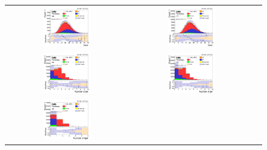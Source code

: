 \begin{figure}[ht]
  \begin{center}
    \begin{tabular}{ccc}
      \includegraphics[width=0.4\textwidth]{figures/tW/fig/Step2/ee/H_pv_n.png}&
      \includegraphics[width=0.4\textwidth]{figures/tW/fig/Step2/mumu/H_pv_n.png}\\
      \includegraphics[width=0.4\textwidth]{figures/tW/fig/Step2/ee/H_N_loose_jets.png}&
      \includegraphics[width=0.4\textwidth]{figures/tW/fig/Step2/mumu/H_N_loose_jets.png}\\
      \includegraphics[width=0.4\textwidth]{figures/tW/fig/Step2/ee/H_N_b_jets.png}&

\end{tabular}
\end{center}
\end{figure}
